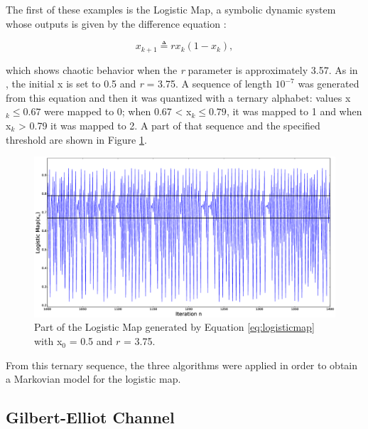 {The first of these examples is the Logistic Map, a symbolic dynamic system whose outputs is given by the difference equation \cite{asok.14}:

\begin{equation}
x_{k+1} \triangleq rx_k(1-x_k), \label{eq:logisticmap}
\end{equation}


\noindent which shows chaotic behavior when the \textit{r} parameter is approximately 3.57. As in \cite{asok.14}, the initial x is set to 0.5 and \textit{r} = 3.75. A sequence of length $10^{-7}$ was generated from this equation and then it was quantized with a ternary alphabet: values x$_k \leq 0.67$ were mapped to 0; when 0.67 < x$_k \leq 0.79$, it was mapped to 1 and when x$_k$ > 0.79 it was mapped to 2. A part of that sequence and the specified threshold are shown in Figure \ref{fig:lmapseq}.

\begin{figure}
\includegraphics[scale=0.25]{Figuras/logisticmap.eps}
\caption{Part of the Logistic Map generated by Equation \ref{eq:logisticmap} with x$_0$ = 0.5 and $r$ = 3.75.\label{fig:lmapseq}}
\end{figure}

From this ternary sequence, the three algorithms were applied in order to obtain a Markovian model for the logistic map.

\subsection{Gilbert-Elliot Channel}

}

